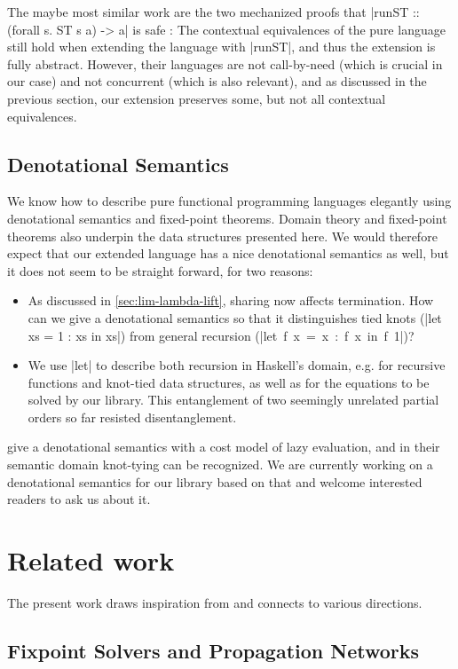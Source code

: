 \documentclass[manuscript,screen,acmsmall,nonacm]{acmart}
\begin{document}
The maybe most similar work are the two mechanized proofs that |runST :: (forall s. ST s a) -> a| is safe \citep{runST,runST2}: The contextual equivalences of the pure language still hold when extending the language with |runST|, and thus the extension is fully abstract.  However, their languages are not call-by-need (which is crucial in our case) and not concurrent (which is also relevant), and as discussed in the previous section, our extension preserves some, but not all contextual equivalences.

\subsection{Denotational Semantics}\label{sec:denotational}

We know how to describe pure functional programming languages elegantly using denotational semantics and fixed-point theorems. Domain theory and fixed-point theorems also underpin the data structures presented here. We would therefore expect that our extended language has a nice denotational semantics as well, but it does not seem to be straight forward, for two reasons:
\begin{itemize}
\item As discussed in \cref{sec:lim-lambda-lift}, sharing now affects termination. How can we give a denotational semantics so that it distinguishes tied knots (|let xs = 1 : xs in xs|) from general recursion (\mbox{|let f x = x : f x in f 1|})?
\item We use |let| to describe both recursion in Haskell's domain, e.g. for recursive functions and knot-tied data structures, as well as for the equations to be solved by our library. This entanglement of two seemingly unrelated partial orders so far resisted disentanglement.
\end{itemize}
 give a denotational semantics with a cost model of lazy evaluation, and in their semantic domain knot-tying can be recognized. We are currently working on a denotational semantics for our library based on that and welcome interested readers to ask us about it.

\section{Related work}\label{sec:related}

The present work draws inspiration from and connects to various directions.

\subsection{Fixpoint Solvers and Propagation Networks}
\end{document}

